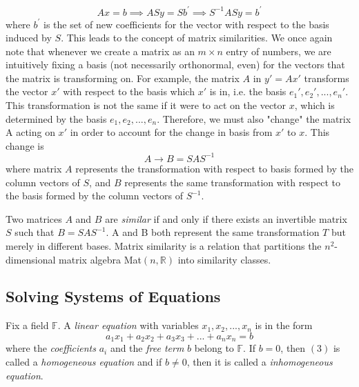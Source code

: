 \documentclass{article}
\begin{document}
    \begin{equation}
      A x = b \implies A S y = S b^\prime \implies S^{-1} A S y = b^\prime
    \end{equation}
    where $b^\prime$ is the set of new coefficients for the vector with respect to the basis induced by $S$. 
    This leads to the concept of matrix similarities. We once again note that whenever we create a matrix as an $m \times n$ entry of numbers, we are intuitively fixing a basis (not necessarily orthonormal, even) for the vectors that the matrix is transforming on. For example, the matrix $A$ in $y' = Ax'$ transforms the vector $x'$ with respect to the basis which $x'$ is in, i.e. the basis ${e_1', e_2', ..., e_n'}$. This transformation is not the same if it were to act on the vector $x$, which is determined by the basis ${e_1, e_2, ..., e_n}$. Therefore, we must also "change" the matrix A acting on $x'$ in order to account for the change in basis from $x'$ to $x$. This change is 
    \begin{equation}
      A \rightarrow B = S A S^{-1}
    \end{equation}
    where matrix $A$ represents the transformation with respect to basis formed by the column vectors of $S$, and $B$ represents the same transformation with respect to the basis formed by the column vectors of $S^{-1}$. 

    \begin{definition}
      Two matrices $A$ and $B$ are \textit{similar} if and only if there exists an invertible matrix $S$ such that $B = S A S^{-1}$. A and B both represent the same transformation $T$ but merely in different bases. Matrix similarity is a relation that partitions the $n^2$-dimensional matrix algebra Mat$(n, \mathbb{R})$ into similarity classes. 
    \end{definition}

  \subsection{Solving Systems of Equations}

    \begin{definition}
      Fix a field $\mathbb{F}$. A \textit{linear equation} with variables $x_1, x_2, ..., x_n$ is in the form 
      \begin{equation}
        a_1 x_1 + a_2 x_2 + a_3 x_3 + ... + a_n x_n = b
      \end{equation}
      where the \textit{coefficients} $a_i$ and the \textit{free term} $b$ belong to $\mathbb{F}$. If $b = 0$, then $(3)$ is called a \textit{homogeneous equation} and if $b \neq 0$, then it is called a \textit{inhomogeneous equation}. 
    \end{definition}
\end{document}

